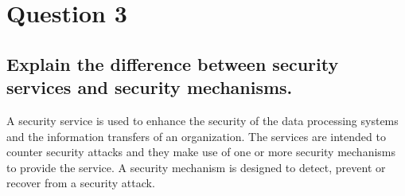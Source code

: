\documentclass{report}
\begin{document}
	\section{Question 3}
	\startsection
		\renewcommand{\thesubsection}{\thesection.\Alph{subsection}}
		\subsection{Explain the difference between security services and security mechanisms.}
		\startsubsection
			A security service is used to enhance the security of the data processing systems and the information transfers of an organization. The services are intended to counter security attacks and they make use of one or more security mechanisms to provide the service. A security mechanism is designed to detect, prevent or recover from a security attack.
		\closesection
	\closesection
\end{document}
